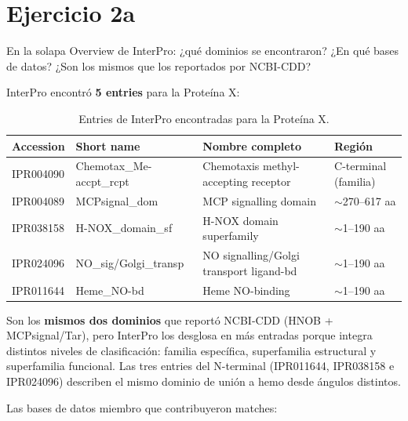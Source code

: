 
\section{Ejercicio 2a}

\begin{consigna}
En la solapa Overview de InterPro: ¿qué dominios se encontraron? ¿En qué bases de datos?
¿Son los mismos que los reportados por NCBI-CDD?
\end{consigna}

InterPro encontró \textbf{5 entries} para la Proteína X:

\begin{table}[H]
\centering
\footnotesize
\begin{tabular}{llP{4.2cm}P{2.8cm}}
\toprule
Accession & Short name & Nombre completo & Región \\
\midrule
IPR004090 & Chemotax\_Me-accpt\_rcpt & Chemotaxis methyl-accepting receptor     & C-terminal (familia) \\
IPR004089 & MCPsignal\_dom           & MCP signalling domain                    & $\sim$270--617 aa \\
IPR038158 & H-NOX\_domain\_sf        & H-NOX domain superfamily                 & $\sim$1--190 aa \\
IPR024096 & NO\_sig/Golgi\_transp    & NO signalling/Golgi transport ligand-bd  & $\sim$1--190 aa \\
IPR011644 & Heme\_NO-bd              & Heme NO-binding                          & $\sim$1--190 aa \\
\bottomrule
\end{tabular}
\caption{Entries de InterPro encontradas para la Proteína X.}
\end{table}

Son los \textbf{mismos dos dominios} que reportó NCBI-CDD (HNOB + MCPsignal/Tar), pero
InterPro los desglosa en más entradas porque integra distintos niveles de clasificación: familia
específica, superfamilia estructural y superfamilia funcional. Las tres entries del N-terminal
(IPR011644, IPR038158 e IPR024096) describen el mismo dominio de unión a hemo desde ángulos
distintos.

Las bases de datos miembro que contribuyeron matches:

